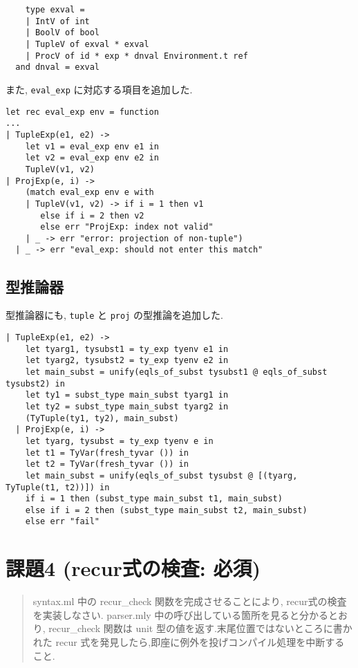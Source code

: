 \begin{lstlisting}
    type exval =
    | IntV of int
    | BoolV of bool
    | TupleV of exval * exval
    | ProcV of id * exp * dnval Environment.t ref
  and dnval = exval 
\end{lstlisting}

また, \lstinline{eval_exp} に対応する項目を追加した.

\begin{lstlisting}[caption=eval.mlの追加コード]
    let rec eval_exp env = function
...
| TupleExp(e1, e2) -> 
    let v1 = eval_exp env e1 in
    let v2 = eval_exp env e2 in 
    TupleV(v1, v2)
| ProjExp(e, i) -> 
    (match eval_exp env e with
    | TupleV(v1, v2) -> if i = 1 then v1
       else if i = 2 then v2 
       else err "ProjExp: index not valid"
    | _ -> err "error: projection of non-tuple")
  | _ -> err "eval_exp: should not enter this match"
\end{lstlisting}

\subsection*{型推論器}

型推論器にも, \lstinline{tuple} と \lstinline{proj} の型推論を追加した.

\begin{lstlisting}[caption=typing.ml]
  | TupleExp(e1, e2) -> 
    let tyarg1, tysubst1 = ty_exp tyenv e1 in
    let tyarg2, tysubst2 = ty_exp tyenv e2 in
    let main_subst = unify(eqls_of_subst tysubst1 @ eqls_of_subst tysubst2) in
    let ty1 = subst_type main_subst tyarg1 in
    let ty2 = subst_type main_subst tyarg2 in
    (TyTuple(ty1, ty2), main_subst)
  | ProjExp(e, i) -> 
    let tyarg, tysubst = ty_exp tyenv e in
    let t1 = TyVar(fresh_tyvar ()) in
    let t2 = TyVar(fresh_tyvar ()) in
    let main_subst = unify(eqls_of_subst tysubst @ [(tyarg, TyTuple(t1, t2))]) in
    if i = 1 then (subst_type main_subst t1, main_subst)
    else if i = 2 then (subst_type main_subst t2, main_subst)
    else err "fail"
\end{lstlisting}

\section*{課題4 (recur式の検査: 必須)}
\begin{quotation}
syntax.ml 中の recur\_check 関数を完成させることにより, recur式の検査を実装しなさい. parser.mly 中の呼び出している箇所を見ると分かるとおり, recur\_check 関数は unit 型の値を返す.末尾位置ではないところに書かれた recur 式を発見したら,即座に例外を投げコンパイル処理を中断すること.
\end{quotation}

